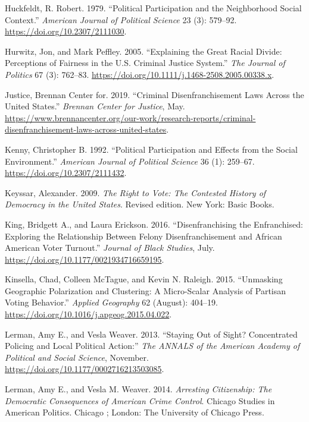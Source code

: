 \documentclass[
  12pt,
]{article}
\newlength{\cslhangindent}
\newenvironment{cslreferences}%
  {\setlength{\parindent}{0pt}%
  \everypar{\setlength{\hangindent}{\cslhangindent}}\ignorespaces}%
  {\par}
\begin{document}
\begin{cslreferences}
\leavevmode\hypertarget{ref-Huckfeldt1979}{}%
Huckfeldt, R. Robert. 1979. ``Political Participation and the Neighborhood Social Context.'' \emph{American Journal of Political Science} 23 (3): 579--92. \url{https://doi.org/10.2307/2111030}.

\leavevmode\hypertarget{ref-Hurwitz2005}{}%
Hurwitz, Jon, and Mark Peffley. 2005. ``Explaining the Great Racial Divide: Perceptions of Fairness in the U.S. Criminal Justice System.'' \emph{The Journal of Politics} 67 (3): 762--83. \url{https://doi.org/10.1111/j.1468-2508.2005.00338.x}.

\leavevmode\hypertarget{ref-bcj_laws}{}%
Justice, Brennan Center for. 2019. ``Criminal Disenfranchisement Laws Across the United States.'' \emph{Brennan Center for Justice}, May. \url{https://www.brennancenter.org/our-work/research-reports/criminal-disenfranchisement-laws-across-united-states}.

\leavevmode\hypertarget{ref-Kenny1992}{}%
Kenny, Christopher B. 1992. ``Political Participation and Effects from the Social Environment.'' \emph{American Journal of Political Science} 36 (1): 259--67. \url{https://doi.org/10.2307/2111432}.

\leavevmode\hypertarget{ref-Keyssar2009}{}%
Keyssar, Alexander. 2009. \emph{The Right to Vote: The Contested History of Democracy in the United States}. Revised edition. New York: Basic Books.

\leavevmode\hypertarget{ref-King2016}{}%
King, Bridgett A., and Laura Erickson. 2016. ``Disenfranchising the Enfranchised: Exploring the Relationship Between Felony Disenfranchisement and African American Voter Turnout.'' \emph{Journal of Black Studies}, July. \url{https://doi.org/10.1177/0021934716659195}.

\leavevmode\hypertarget{ref-Kinsella2015}{}%
Kinsella, Chad, Colleen McTague, and Kevin N. Raleigh. 2015. ``Unmasking Geographic Polarization and Clustering: A Micro-Scalar Analysis of Partisan Voting Behavior.'' \emph{Applied Geography} 62 (August): 404--19. \url{https://doi.org/10.1016/j.apgeog.2015.04.022}.

\leavevmode\hypertarget{ref-Lerman2013}{}%
Lerman, Amy E., and Vesla Weaver. 2013. ``Staying Out of Sight? Concentrated Policing and Local Political Action:'' \emph{The ANNALS of the American Academy of Political and Social Science}, November. \url{https://doi.org/10.1177/0002716213503085}.

\leavevmode\hypertarget{ref-Lerman2014}{}%
Lerman, Amy E., and Vesla M. Weaver. 2014. \emph{Arresting Citizenship: The Democratic Consequences of American Crime Control}. Chicago Studies in American Politics. Chicago ; London: The University of Chicago Press.


\end{cslreferences}
\end{document}
